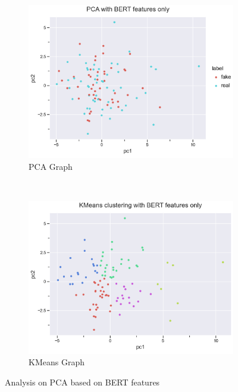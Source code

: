 \documentclass{article}
\begin{document}
\begin{figure}[t!]
  \centering
  \begin{subfigure}[t]{0.5\textwidth}
    \centering
    \includegraphics[scale=0.5]{img/pca_1.png}
    \caption{PCA Graph}
    \label{pca_1}
  \end{subfigure}%
  ~
  \begin{subfigure}[t]{0.5\textwidth}
    \centering
    \includegraphics[scale=0.5]{img/kmeans_1.png}
    \caption{KMeans Graph}
    \label{kmeans_1}
  \end{subfigure}
  \caption{Analysis on PCA based on BERT features}
  \label{pca_kmeans_1}
\end{figure}
\end{document}
